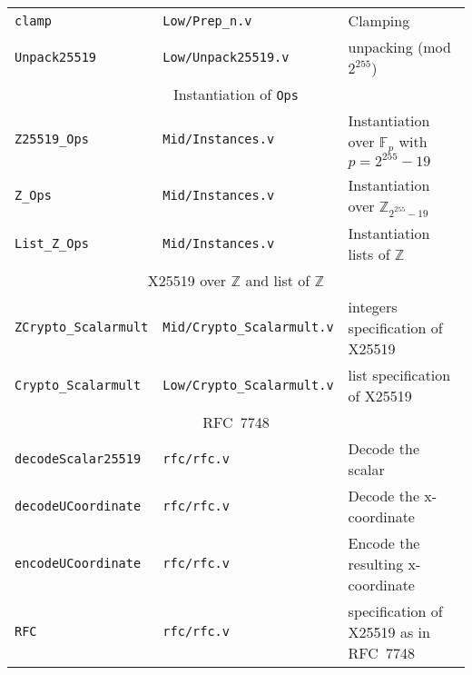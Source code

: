 \documentclass[8pt]{extarticle}
\newcommand{\p}{\ensuremath{2^{255}-19}}
\newcommand{\Zfield}{\ensuremath{\mathbb{Z}_{\p}}}
\newcommand{\Z}{\ensuremath{\mathbb{Z}}\xspace}
\newcommand{\F}[1]{\ensuremath{\mathbb{F}_{#1}}\xspace}
\begin{document}
\begin{table*}[h]
\begin{tabular}{ l | l | l }
    \texttt{clamp} & \texttt{Low/Prep\_n.v} & Clamping \\
    \texttt{Unpack25519} & \texttt{Low/Unpack25519.v} & unpacking (mod $2^{255}$)\\
    \hline
    \multicolumn{3}{c}{Instantiation of \texttt{Ops}}\\
    \hline
    \texttt{Z25519\_Ops} & \texttt{Mid/Instances.v} & Instantiation over \F{p} with $p = \p$\\
    \texttt{Z\_Ops} & \texttt{Mid/Instances.v} & Instantiation over $\Zfield$ \\
    \texttt{List\_Z\_Ops} & \texttt{Mid/Instances.v} & Instantiation lists of \Z \\
    \hline
    \multicolumn{3}{c}{X25519 over \Z and list of \Z}\\
    \hline
    \texttt{ZCrypto\_Scalarmult} & \texttt{Mid/Crypto\_Scalarmult.v} & integers specification of X25519\\
    \texttt{Crypto\_Scalarmult} & \texttt{Low/Crypto\_Scalarmult.v} & list specification of X25519\\
    \hline
    \multicolumn{3}{c}{RFC~7748}\\
    \hline
    \texttt{decodeScalar25519} & \texttt{rfc/rfc.v} & Decode the scalar\\
    \texttt{decodeUCoordinate} & \texttt{rfc/rfc.v} & Decode the x-coordinate\\
    \texttt{encodeUCoordinate} & \texttt{rfc/rfc.v} & Encode the resulting x-coordinate\\
    \texttt{RFC} & \texttt{rfc/rfc.v} & specification of X25519 as in RFC~7748\\
    \hline
\end{tabular}
\end{table*}
\end{document}
